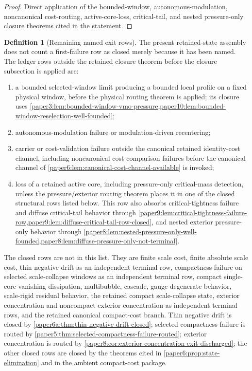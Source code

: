 \documentclass[11pt]{amsart}
\theoremstyle{plain}
\theoremstyle{definition}
\newtheorem{definition}[definition]{Definition}
\theoremstyle{remark}
\begin{document}
\begin{proof}
Direct application of the bounded-window, autonomous-modulation, noncanonical
cost-routing, active-core-loss, critical-tail, and nested pressure-only
closure theorems cited in the statement.
\end{proof}

\begin{definition}[Remaining named exit rows]
\label{paper6:def:remaining-named-exits}
The present retained-state assembly does not count a first-failure row as
closed merely because it has been named.  The ledger rows outside the retained
closure theorem before the closure subsection is applied are:
\begin{enumerate}[label=\textup{(\roman*)}]
\item a bounded selected-window limit producing a bounded local profile on a
fixed physical window, before the physical routing theorem is applied;
its closure uses
\cref{paper3:lem:bounded-window-vmo-pressure,paper10:lem:bounded-window-reselection-well-founded};
\item autonomous-modulation failure or modulation-driven recentering;
\item carrier or cost-validation failure outside the canonical retained
identity-cost channel, including noncanonical cost-comparison failures before
the canonical channel of \cref{paper6:lem:canonical-cost-channel-available} is
invoked;
\item loss of a retained active core, including pressure-only critical-mass
detection, unless the pressure/exterior routing theorem places it in one of the
closed structural rows listed below.  This row also absorbs critical-tightness
failure and diffuse critical-tail behavior through
\cref{paper9:lem:critical-tightness-failure-row,paper9:lem:diffuse-critical-tail-row-closed},
and nested exterior pressure-only behavior through
\cref{paper8:lem:nested-pressure-only-well-founded,paper8:lem:diffuse-pressure-only-not-terminal}.
\end{enumerate}
The closed rows are not in this list.  They are finite scale cost, finite
absolute scale cost, thin negative drift as an independent terminal row,
compactness failure on selected scale-collapse windows as an independent
terminal row,
compact single-core vanishing dissipation, multibubble, cascade,
gauge-degenerate behavior, scale-rigid residual behavior, the retained compact
scale-collapse state, exterior concentration and noncompact exterior
concentration as independent terminal rows, and the retained canonical
compact-cost branch.  Thin
negative drift is closed by
\cref{paper6a:thm:thin-negative-drift-closed}; selected compactness failure is
routed by \cref{paper5:thm:selected-compactness-failure-routed}; exterior
concentration is routed by
\cref{paper8:cor:exterior-concentration-exit-discharged}; the other closed
rows are
closed by the theorems cited in \cref{paper6:prop:state-elimination} and in the
ambient compact-cost package.


\end{definition}
\end{document}
